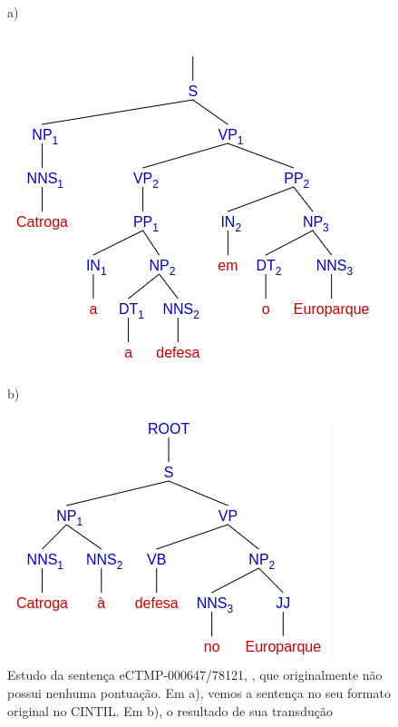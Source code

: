 \begin{figure}[!ht]
    \centering
    a)
    \begin{minipage}{.45\textwidth}
        \includegraphics[width=\linewidth]{imagens/ec_cintil_sem_ponto_tree_trans.png}
    \end{minipage}
    b)
    \begin{minipage}{.45\textwidth}
        \includegraphics[width=\linewidth]{imagens/ec_cintil_sem_ponto_tree_sp.png}
    \end{minipage}
    \caption[Estudo de caso CINTIL - Sentença transduzida sem pontuação]{Estudo da sentença eCTMP-000647/78121, , que originalmente não possui nenhuma pontuação. Em a), vemos a sentença no seu formato original no CINTIL. Em b), o resultado de sua transdução}
    \label{fig:ec_cintil_sem_ponto_tree}
\end{figure}